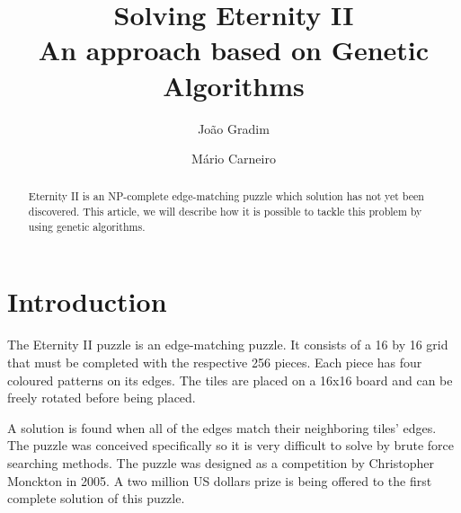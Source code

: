 \documentclass{llncs}
\begin{document}
%
\frontmatter          %
%
\pagestyle{headings}  %
%

\mainmatter              %
%
\title{Solving Eternity II\\
    \small{An approach based on Genetic Algorithms}
  }
  \author{João Gradim \and Mário Carneiro}
%
%

\maketitle              %

\begin{abstract}
Eternity II is an NP-complete edge-matching puzzle which solution has not yet been discovered. This article, we will describe how it is possible to tackle this problem by using genetic algorithms.
\end{abstract}
%
\section{Introduction}\label{sec:introduction}

The Eternity II puzzle is an edge-matching puzzle. It consists of a 16 by 16 grid that must be completed with the respective 256 pieces. Each piece has four coloured patterns on its edges. The tiles are placed on a 16x16 board and can be freely rotated before being placed.

A solution is found when all of the edges match their neighboring tiles' edges. The puzzle was conceived specifically so it is very difficult to solve by brute force searching methods. The puzzle was designed as a competition by Christopher Monckton in 2005.\cite{monckton} A two million US dollars prize is being offered to the first complete solution of this puzzle.\cite{unsolved}
\end{document}
